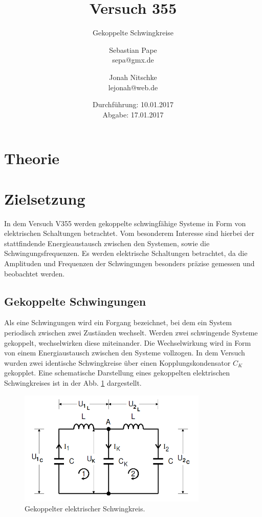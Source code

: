 

\title{Versuch 355}
\subtitle{Gekoppelte Schwingkreise}
\author{Sebastian Pape\\
        sepa@gmx.de \and
        Jonah Nitschke\\
        lejonah@web.de}
\date{Durchführung: 10.01.2017\\
      Abgabe: 17.01.2017}


\maketitle
\setcounter{page}{1}

\section{Theorie}

\section{Zielsetzung}

In dem Versuch V355 werden gekoppelte schwingfähige Systeme in Form von elektrischen
Schaltungen betrachtet. Vom besonderem Interesse sind hierbei der stattfindende
Energieaustausch zwischen den Systemen, sowie die Schwingungsfrequenzen.
Es werden elektrische Schaltungen betrachtet, da die Amplituden und Frequenzen
der Schwingungen besonders präzise gemessen und beobachtet werden.

\subsection{Gekoppelte Schwingungen}

Als eine Schwingungen wird ein Forgang bezeichnet, bei dem ein System periodisch
zwischen zwei Zuständen wechselt. Werden zwei schwingende Systeme gekoppelt,
wechselwirken diese miteinander. Die Wechselwirkung wird in Form von einem
Energiaustausch zwischen den Systeme vollzogen. In dem Versuch wurden zwei identische
Schwingkreise über einen Kopplungskondensator $C_K$ gekopplet. Eine schematische
Darstellung eines gekoppelten elektrischen Schwingkreises ist in der Abb.
\ref{fig:gekoppelterSchwingkreis} dargestellt.

\begin{figure}
  \centering
  \includegraphics[width=9cm]{V355_allg_Schwingkreis.png}
  \caption{Gekoppelter elektrischer Schwingkreis.\cite{anleitung01}\protect}
  \label{fig:gekoppelterSchwingkreis}
\end{figure}

